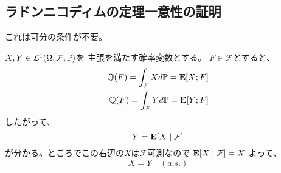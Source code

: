  \subsection{ラドンニコディムの定理一意性の証明}
    これは可分の条件が不要。

    $X,Y \in \mathcal{L}^1(\Omega, \mathcal{F}, {\mathbb{P}})$を
    主張を満たす確率変数とする。
    $F \in \mathcal{F}$とすると、
    \begin{align*}
      \mathbb{Q}(F) = \int_F X d{\mathbb{P}} = {\mathbf{E}}[X;F]\\
      \mathbb{Q}(F) = \int_F Y d{\mathbb{P}} = {\mathbf{E}}[Y;F]
    \end{align*}
    したがって、
    \[
      Y = {\mathbf{E}}[X \mid \mathcal{F}]
    \]
    が分かる。ところでこの右辺の$X$は$\mathcal{F}$可測なので
    ${\mathbf{E}}[X \mid \mathcal{F}] = X$
    よって、
    \[
      X = Y \quad (a.s.)
    \]
